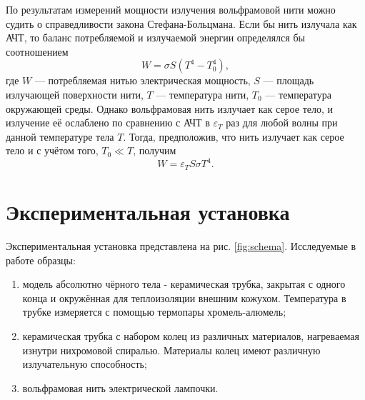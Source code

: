 \documentclass[a4paper]{article}
\begin{document}
\noindent По результатам измерений мощности излучения вольфрамовой нити можно судить о справедливости закона Стефана-Больцмана. Если бы нить излучала как АЧТ, то баланс потребляемой и излучаемой энергии определялся бы соотношением
$$W = \sigma S (T^4 - T_0^4),$$
где $W$ --- потребляемая нитью электрическая мощность, $S$ --- площадь излучающей поверхности нити, $T$ --- температура нити, $T_0$ --- температура окружающей среды. Однако вольфрамовая нить излучает как серое тело, и излучение её ослаблено по сравнению с АЧТ в $\varepsilon_{T}$ раз для любой волны при данной температуре тела $T$. Тогда, предположив, что
нить излучает как серое тело и с учётом того, $T_0 \ll T$, получим 
$$W = \varepsilon_{T}S \sigma T^4.$$

\section{Экспериментальная установка}

Экспериментальная установка представлена на рис. \ref*{fig:schema}. Исследуемые в работе образцы: 
\begin{enumerate}
    \item модель абсолютно чёрного тела - керамическая трубка, закрытая с одного конца и окружённая для теплоизоляции внешним кожухом. Температура в трубке измеряется с помощью термопары хромель-алюмель;
    \item керамическая трубка с набором колец из различных материалов, нагреваемая изнутри нихромовой спиралью. Материалы колец имеют различную излучательную способность;
    \item вольфрамовая нить электрической лампочки.
\end{enumerate}
\end{document}
